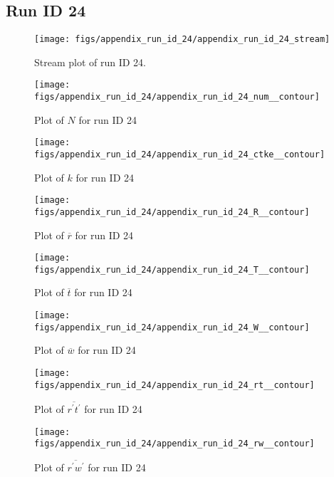 \subsection{Run ID 24}
\begin{figure}[H]
\centering
\texttt{[image: figs/appendix\_run\_id\_24/appendix\_run\_id\_24\_stream]}
\caption{Stream plot of run ID 24.}
\label{fig:appendix_run_id_24_stream}
\end{figure}


\begin{figure}[H]
\centering
\texttt{[image: figs/appendix\_run\_id\_24/appendix\_run\_id\_24\_num\_\_contour]}
\caption{Plot of $N$ for run ID 24}
\label{fig:appendix_run_id_24_num__contour}
\end{figure}


\begin{figure}[H]
\centering
\texttt{[image: figs/appendix\_run\_id\_24/appendix\_run\_id\_24\_ctke\_\_contour]}
\caption{Plot of $k$ for run ID 24}
\label{fig:appendix_run_id_24_ctke__contour}
\end{figure}


\begin{figure}[H]
\centering
\texttt{[image: figs/appendix\_run\_id\_24/appendix\_run\_id\_24\_R\_\_contour]}
\caption{Plot of $\overline{r}$ for run ID 24}
\label{fig:appendix_run_id_24_R__contour}
\end{figure}


\begin{figure}[H]
\centering
\texttt{[image: figs/appendix\_run\_id\_24/appendix\_run\_id\_24\_T\_\_contour]}
\caption{Plot of $\overline{t}$ for run ID 24}
\label{fig:appendix_run_id_24_T__contour}
\end{figure}


\begin{figure}[H]
\centering
\texttt{[image: figs/appendix\_run\_id\_24/appendix\_run\_id\_24\_W\_\_contour]}
\caption{Plot of $\overline{w}$ for run ID 24}
\label{fig:appendix_run_id_24_W__contour}
\end{figure}


\begin{figure}[H]
\centering
\texttt{[image: figs/appendix\_run\_id\_24/appendix\_run\_id\_24\_rt\_\_contour]}
\caption{Plot of $\overline{r^\prime t^\prime}$ for run ID 24}
\label{fig:appendix_run_id_24_rt__contour}
\end{figure}


\begin{figure}[H]
\centering
\texttt{[image: figs/appendix\_run\_id\_24/appendix\_run\_id\_24\_rw\_\_contour]}
\caption{Plot of $\overline{r^\prime w^\prime}$ for run ID 24}
\label{fig:appendix_run_id_24_rw__contour}
\end{figure}


